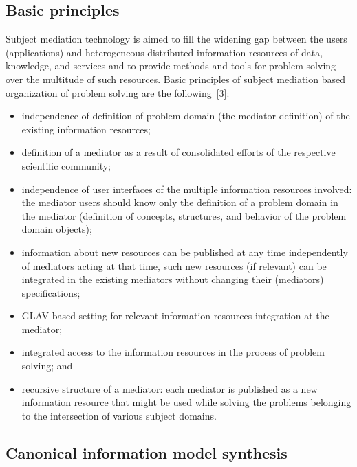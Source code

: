 \begin{multicols}{2}
\subsection{Basic principles}

\noindent
Subject mediation technology is aimed to fill the widening gap between the users (applications) and 
heterogeneous distributed information resources of data, knowledge, and services and to provide 
methods and tools for problem solving over the multitude of such resources. Basic principles of 
subject mediation based organization of problem solving are the following~[3]:
\begin{itemize}
\item independence of definition of problem domain (the mediator definition) of the existing 
information resources;\\[-9pt]
\item definition of a mediator as a result of consolidated efforts of the respective scientific 
community;\\[-9pt] 
\item independence of user interfaces of the multiple information resources involved: the 
mediator users should know only the definition of a problem domain in the mediator 
(definition of concepts, structures, and behavior of the problem domain objects);\\[-9pt]
\item information about new resources can be published at any time independently of 
mediators acting at that time, such new resources (if relevant) can be integrated in the existing 
mediators without changing their (mediators) specifications;\\[-9pt]
\item GLAV-based setting for relevant information resources integration at the mediator;\\[-9pt] 
\item integrated access to the information resources in the process of problem solving; and\\[-9pt]
\item recursive structure of a mediator: each mediator is published as a new information 
resource that might be used while solving the problems belonging to the intersection of various 
subject domains.
\end{itemize}

\subsection{Canonical information model synthesis}


\end{multicols}
